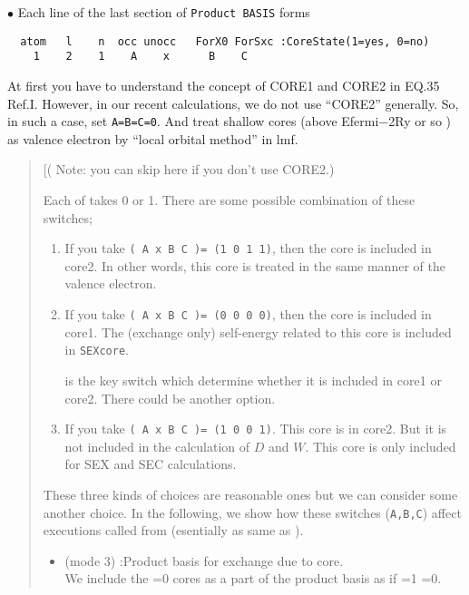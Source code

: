 \documentclass[a4paper,10pt,epsf,fleqn]{article}
\begin{document}
\vspace{5mm}
\noindent $\bullet$ Each line of the last section of {\tt Product BASIS} forms
{\baselineskip=2.6mm
\begin{verbatim}
  atom   l    n  occ unocc   ForX0 ForSxc :CoreState(1=yes, 0=no)
    1    2    1    A    x      B    C
\end{verbatim}}
At first you have to understand the concept of CORE1 and CORE2 in EQ.35 Ref.I.
However, in our recent calculations, we do not use ``CORE2'' generally.
So, in such a case, set \verb#A=B=C=0#. And treat shallow cores (above Efermi$-$2Ry or so )
as valence electron by ``local orbital method'' in lmf.

\begin{quote}
[( Note: you can skip here if you don't use CORE2.)

Each of  takes 0 or 1.
There are some possible combination of these switches;
\begin{enumerate}
\item 
If you take 
{\tt ( A  x   B    C )= (1 0 1 1)},
then the core is included in core2. In other words, this core is treated in the same 
manner of the valence electron.

\item 
If you take
{\tt ( A  x   B    C )= (0 0 0 0)},
then the core is included in core1.
The (exchange only) self-energy related to this core is included in {\tt SEXcore}.

 is the key switch which determine whether it is included in core1 or core2.
There could be another option.

\item 
If you take
{\tt ( A  x   B    C )= (1 0 0 1)}.
This core is in core2. But it is not included in the calculation of $D$ and $W$.
This core is only included for SEX and SEC calculations.
\end{enumerate}
These three kinds of choices are reasonable ones but we can consider some another choice.
In the following, we show how these switches (\verb#A,B,C#) affect executions called from 
 (esentially as same as ).
\begin{itemize}
\item 
{}(mode 3) :Product basis for exchange due to core.\\
We include the =0 cores as a part of
the product basis as if =1 =0.


\end{itemize}
\end{quote}
\end{document}
